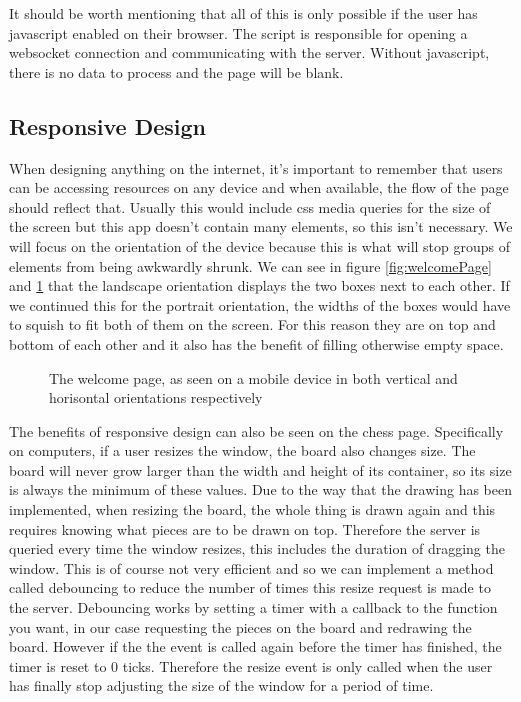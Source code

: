 It should be worth mentioning that all of this is only possible if the user has javascript enabled on their browser. The script is responsible for opening a websocket connection and communicating with the server. Without javascript, there is no data to process and the page will be blank.

\subsection{Responsive Design}

When designing anything on the internet, it's important to remember that users can be accessing resources on any device and when available, the flow of the page should reflect that. Usually this would include css media queries for the size of the screen but this app doesn't contain many elements, so this isn't necessary. We will focus on the orientation of the device because this is what will stop groups of elements from being awkwardly shrunk. We can see in figure \ref{fig:welcomePage} and \ref{fig:responsiveDesign} that the landscape orientation displays the two boxes next to each other. If we continued this for the portrait orientation, the widths of the boxes would have to squish to fit both of them on the screen. For this reason they are on top and bottom of each other and it also has the benefit of filling otherwise empty space.

\begin{figure}
    \begin{center}
        \captionsetup{justification=centering}

        \hspace{1cm}
        \caption{The welcome page, as seen on a mobile device in both vertical and horisontal orientations respectively}
        \label{fig:responsiveDesign}
    \end{center}
\end{figure}

The benefits of responsive design can also be seen on the chess page. Specifically on computers, if a user resizes the window, the board also changes size. The board will never grow larger than the width and height of its container, so its size is always the minimum of these values. Due to the way that the drawing has been implemented, when resizing the board, the whole thing is drawn again and this requires knowing what pieces are to be drawn on top. Therefore the server is queried every time the window resizes, this includes the duration of dragging the window. This is of course not very efficient and so we can implement a method called debouncing \cite{Debouncing} to reduce the number of times this resize request is made to the server. Debouncing works by setting a timer with a callback to the function you want, in our case requesting the pieces on the board and redrawing the board. However if the the event is called again before the timer has finished, the timer is reset to 0 ticks. Therefore the resize event is only called when the user has finally stop adjusting the size of the window for a period of time.